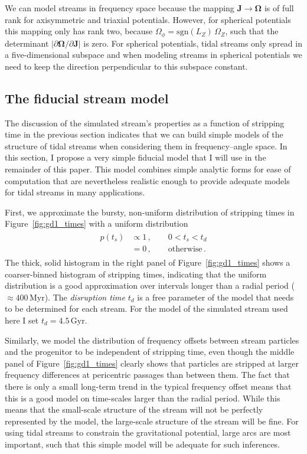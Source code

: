 \documentclass[12pt,preprint]{aastex}
\renewcommand{\figurename}{Figure}
\renewcommand{\vec}[1]{\ensuremath{\mathbf{#1}}}
\newcommand{\vecj}{\ensuremath{\vec{J}}}
\newcommand{\veco}{\ensuremath{\vec{\Omega}}}
\newcommand{\Myr}{\ensuremath{\,\mathrm{Myr}}}
\newcommand{\Gyr}{\ensuremath{\,\mathrm{Gyr}}}
\newcommand{\ts}{\ensuremath{t_s}}
\begin{document}
We can model streams in frequency space because the mapping $\vecj
\rightarrow \veco$ is of full rank for axisymmetric and triaxial
potentials. However, for spherical potentials this mapping only has
rank two, because $\Omega_\phi = \mathrm{sgn}(L_Z)\,\Omega_Z$, such
that the determinant $|\partial \veco / \partial \vecj|$ is zero. For
spherical potentials, tidal streams only spread in a five-dimensional
subspace and when modeling streams in spherical potentials we need to
keep the direction perpendicular to this subspace constant.

\subsection{The fiducial stream model}\label{sec:fidmodel}

The discussion of the simulated stream's properties as a function of
stripping time in the previous section indicates that we can build
simple models of the structure of tidal streams when considering them
in frequency--angle space. In this section, I propose a very simple
fiducial model that I will use in the remainder of this paper. This
model combines simple analytic forms for ease of computation that are
nevertheless realistic enough to provide adequate models for tidal
streams in many applications.

First, we approximate the bursty, non-uniform distribution of
stripping times in \figurename~\ref{fig:gd1_times} with a uniform
distribution
\begin{align}\label{eq:pt}
  \begin{split}
    p(\ts) & \propto 1\,,\qquad 0 < \ts < t_d\\
    & = 0\,,\qquad \mathrm{otherwise}\,.
  \end{split}
\end{align}
The thick, solid histogram in the right panel of
\figurename~\ref{fig:gd1_times} shows a coarser-binned histogram of
stripping times, indicating that the uniform distribution is a good
approximation over intervals longer than a radial period ($\approx
400\Myr$). The \emph{disruption time} $t_d$ is a free parameter of the
model that needs to be determined for each stream. For the model of
the simulated stream used here I set $t_d = 4.5\Gyr$.

Similarly, we model the distribution of frequency offsets between
stream particles and the progenitor to be independent of stripping
time, even though the middle panel of \figurename~\ref{fig:gd1_times}
clearly shows that particles are stripped at larger frequency
differences at pericentric passages than between them. The fact that
there is only a small long-term trend in the typical frequency offset
means that this is a good model on time-scales larger than the radial
period. While this means that the small-scale structure of the stream
will not be perfectly represented by the model, the large-scale
structure of the stream will be fine. For using tidal streams to
constrain the gravitational potential, large arcs are most important,
such that this simple model will be adequate for such inferences.
\end{document}
